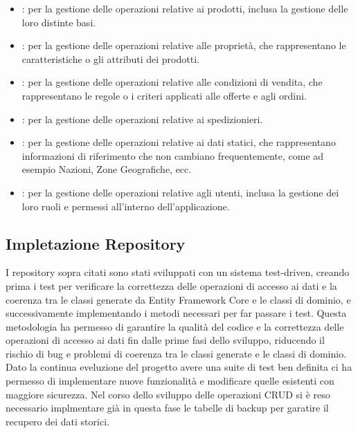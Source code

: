 \documentclass[12pt, a4paper]{article}
\begin{document}
\begin{itemize}
    \item {}: per la gestione delle operazioni relative ai prodotti, inclusa la gestione delle loro distinte basi.
    \item {}: per la gestione delle operazioni relative alle proprietà, che rappresentano le caratteristiche o gli attributi dei prodotti.
    \item {}: per la gestione delle operazioni relative alle condizioni di vendita, che rappresentano le regole o i criteri applicati alle offerte e agli ordini.
    \item {}: per la gestione delle operazioni relative ai spedizionieri.
    \item {}: per la gestione delle operazioni relative ai dati statici, che rappresentano informazioni di riferimento che non cambiano frequentemente,
    come ad esempio Nazioni, Zone Geografiche, ecc.
    \item {}: per la gestione delle operazioni relative agli utenti, inclusa la gestione dei loro ruoli e permessi all'interno dell'applicazione.
\end{itemize}

\subsection{Impletazione Repository}
I repository sopra citati sono stati sviluppati con un sistema test-driven,
creando prima i test per verificare la correttezza delle operazioni di accesso ai dati e
la coerenza tra le classi generate da Entity Framework Core e le classi di dominio, e successivamente implementando i metodi necessari per far passare i test.
Questa metodologia ha permesso di garantire la qualità del codice e la correttezza
delle operazioni di accesso ai dati fin dalle prime fasi dello sviluppo,
riducendo il rischio di bug e problemi di coerenza tra le classi generate e le classi di dominio.
Dato la continua eveluzione del progetto avere una suite di test ben definita ci ha permesso di implementare nuove funzionalità
e modificare quelle esistenti con maggiore sicurezza.
Nel corso dello sviluppo delle operazioni CRUD si è reso necessario implmentare già in questa fase le tabelle di backup
per garatire il recupero dei dati storici.
\end{document}
